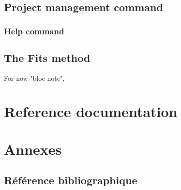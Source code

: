 \documentclass[a4paper]{book}
\begin{document}

\chapter{Project management command}

\section{Help command}

\label{HelpCmd}



\chapter{The Fits method}

For now "bloc-note",







\part{Reference documentation}




\part{Annexes}

\appendix

\chapter{R\'ef\'erence bibliographique}
\end{document}
